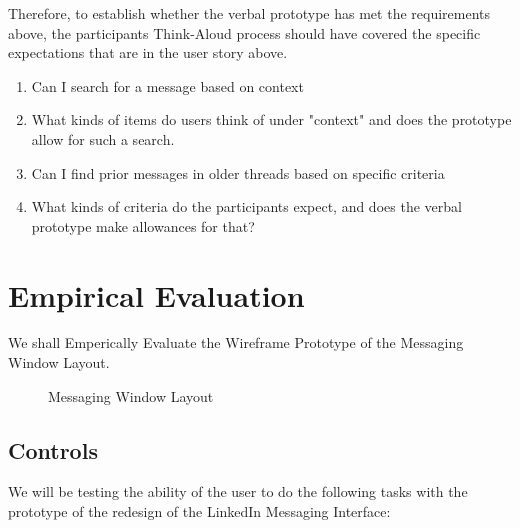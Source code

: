 \documentclass[
	letterpaper, %
]{jdf}
\begin{document}
Therefore, to establish whether the verbal prototype has met the requirements above, the participants Think-Aloud process should have covered the specific expectations that are in the user
story above.
\begin{enumerate}
    \item Can I search for a message based on context
    \item What kinds of items do users think of under "context" and does the prototype allow for such a search.
    \item Can I find prior messages in older threads based on specific criteria
    \item What kinds of criteria do the participants expect, and does the verbal prototype make allowances for that?
\end{enumerate}

\section{Empirical Evaluation}
We shall Emperically Evaluate the Wireframe Prototype of the Messaging Window Layout.


\begin{figure}[h]
	\centering
	\caption{Messaging Window Layout}
	\label{fig:layout}
\end{figure}




\subsection{Controls}
We will be testing the ability of the user to do the following tasks with the prototype of the redesign of the LinkedIn Messaging Interface:
\end{document}
